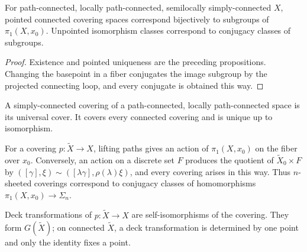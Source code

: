 \begin{theorem}
\label{thm:covering-space-classification}
\leanok
{}
For path-connected, locally path-connected, semilocally simply-connected $X$,
pointed connected covering spaces correspond bijectively to subgroups of
$\pi_1(X,x_0)$. Unpointed isomorphism classes correspond to conjugacy classes
of subgroups.
\end{theorem}

\begin{proof}
\leanok
\sketch Existence and pointed uniqueness are the preceding propositions.
Changing the basepoint in a fiber conjugates the image subgroup by the
projected connecting loop, and every conjugate is obtained this way.
\end{proof}

\begin{definition}
\label{def:universal-cover}
\leanok
{}
A simply-connected covering of a path-connected, locally path-connected space
is its universal cover. It covers every connected covering and is unique up
to isomorphism.
\end{definition}

For a covering $p:\widetilde X\to X$, lifting paths gives an action of
$\pi_1(X,x_0)$ on the fiber over $x_0$. Conversely, an action on a discrete set
$F$ produces the quotient of $\widetilde X_0\times F$ by
$([\gamma],\xi)\sim([\lambda\gamma],\rho(\lambda)\xi)$, and every covering
arises in this way. Thus $n$-sheeted coverings correspond to conjugacy classes
of homomorphisms $\pi_1(X,x_0)\to\Sigma_n$.

\begin{definition}
\label{def:deck-transformation-group}
\leanok
{}
Deck transformations of $p:\widetilde X\to X$ are self-isomorphisms of the
covering. They form $G(\widetilde X)$; on connected $\widetilde X$, a deck
transformation is determined by one point and only the identity fixes a point.
\end{definition}

